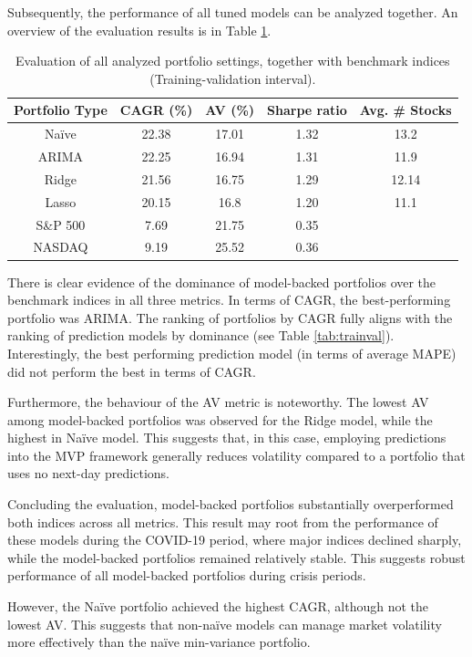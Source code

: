 Subsequently, the performance of all tuned models can be analyzed together. An overview of the evaluation results is in Table \ref{tab:eval}.

\begin{table}[H]
\centering
\begin{tabular}{|c|c|c|c|c|}
\hline
\textbf{Portfolio Type} & \textbf{CAGR (\%)} & \textbf{AV (\%)} & \textbf{Sharpe ratio} & \textbf{Avg. \# Stocks} \\
\hline
Naïve & 22.38 & 17.01 & 1.32& 13.2 \\
\hline
ARIMA & 22.25 & 16.94 & 1.31& 11.9 \\
\hline
Ridge & 21.56 & 16.75 & 1.29& 12.14 \\
\hline
Lasso & 20.15 & 16.8 & 1.20& 11.1 \\
\hline
\hline
S\&P 500 & 7.69 & 21.75 & 0.35& \\
\hline
NASDAQ & 9.19 & 25.52 & 0.36& \\
\hline
\end{tabular}
\caption{\centering Evaluation of all analyzed portfolio settings, together with benchmark indices (Training-validation interval).}
\label{tab:eval}
\end{table}

There is clear evidence of the dominance of model-backed portfolios over the benchmark indices in all three metrics. In terms of CAGR, the best-performing portfolio was ARIMA. The ranking of portfolios by CAGR 
fully aligns with the ranking of prediction models by dominance (see Table \ref{tab:trainval}). Interestingly, the best performing prediction model (in terms of average MAPE) did not perform the best in terms of CAGR.

Furthermore, the behaviour of the AV metric is noteworthy. The lowest AV among model-backed portfolios was observed for the Ridge model, while the highest in Naïve model. This suggests that, in this case, employing predictions into the MVP framework generally reduces volatility compared to a 
portfolio that uses no next-day predictions. 

Concluding the evaluation, model-backed portfolios substantially overperformed both indices across all metrics. This result may root from the performance of these models during the COVID-19 period, where major indices declined sharply, while the model-backed portfolios remained relatively stable.
This suggests robust performance of all model-backed portfolios during crisis periods. 

However, the Naïve portfolio achieved the highest CAGR, although not the lowest AV. This suggests that non-naïve models can manage market volatility more effectively than the naïve min-variance portfolio. 

